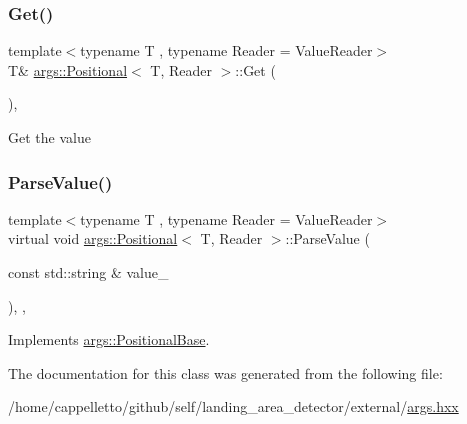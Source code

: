 \subsubsection{\texorpdfstring{Get()}{Get()}}
{\footnotesize\ttfamily template$<$typename T , typename Reader  = Value\+Reader$>$ \\
T\& \hyperlink{classargs_1_1_positional}{args\+::\+Positional}$<$ T, Reader $>$\+::Get (\begin{DoxyParamCaption}{ }\end{DoxyParamCaption})\hspace{0.3cm}{\ttfamily [inline]}, {\ttfamily [noexcept]}}

Get the value \mbox{\label{classargs_1_1_positional_a2ae24a17caca2e02b95f0977783fc65d}} 
\subsubsection{\texorpdfstring{Parse\+Value()}{ParseValue()}}
{\footnotesize\ttfamily template$<$typename T , typename Reader  = Value\+Reader$>$ \\
virtual void \hyperlink{classargs_1_1_positional}{args\+::\+Positional}$<$ T, Reader $>$\+::Parse\+Value (\begin{DoxyParamCaption}\item[{const std\+::string \&}]{value\+\_\+ }\end{DoxyParamCaption})\hspace{0.3cm}{\ttfamily [inline]}, {\ttfamily [override]}, {\ttfamily [virtual]}}



Implements \hyperlink{classargs_1_1_positional_base_a10b6b91155f56bc28ca25fa87c6f0985}{args\+::\+Positional\+Base}.



The documentation for this class was generated from the following file\+:\begin{DoxyCompactItemize}
\item 
/home/cappelletto/github/self/landing\+\_\+area\+\_\+detector/external/\hyperlink{args_8hxx}{args.\+hxx}\end{DoxyCompactItemize}
